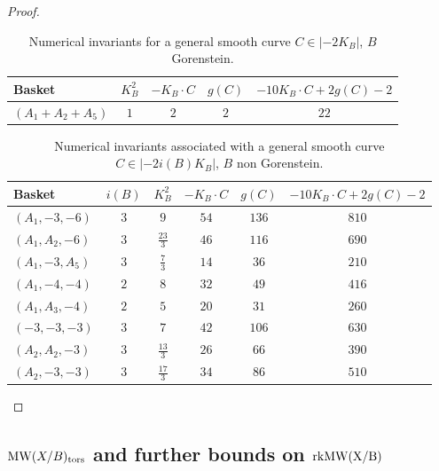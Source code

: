 \documentclass[11pt]{amsart}
\theoremstyle{definition}
\theoremstyle{definition}
\theoremstyle{remark}
\theoremstyle{remark}
\theoremstyle{definition}
\theoremstyle{conjecture}
\newcommand{\MW}{\mathrm{MW}}
\begin{document}
\begin{proof}
\begin{table}[ht]
\caption{\scriptsize  Numerical invariants for a general smooth curve $C\in |-2K_B|$, $B$ Gorenstein.}
\label{tab:gorenstein-delpezzo-2K}
\centering
\small
\renewcommand{\arraystretch}{1.5}
\begin{tabular}{|l|c|c|c|c|}
\hline
\textbf{Basket} & \textbf{$K_B^2$} & \textbf{$-K_B\cdot C$} & \textbf{$g(C)$} & \textbf{$-10K_B\cdot C+2g(C)-2$} \\
\hline
$(A_1+A_2+A_5)$ & $1$ & $2$ & $2$ & $22$ \\
\hline
\end{tabular}
\end{table}
\begin{table}[ht]
\caption{ \scriptsize Numerical invariants associated with a general smooth curve $C\in |-2i(B)K_B|$, $B$ non Gorenstein.}
\label{tab:delpezzo}
\centering
\small
\renewcommand{\arraystretch}{1.5}
\begin{tabular}{|l|c|c|c|c|c|}
\hline
\textbf{Basket} & $i(B)$ & $K_B^2$ &  $-K_B \cdot C %
$ & $g(C)$ & $-10K_B\cdot C+2g(C)-2$ \\
\hline $(A_1,-3,-6)$ & $3$ & $9$ & $54$ & $136$ & $810$ \\
\hline
$(A_1,A_2,-6)$ & $3$ & $\frac{23}{3}$ & $46$ & $116$ & $690$ \\
\hline
$(A_1,-3,A_5)$ & $3$ & $\frac{7}{3}$ & $14$ & $36$ & $210$ \\
\hline
$(A_1,-4,-4)$ & $2$ & $8$ & $32$ & $49$ & $416$ \\
\hline
$(A_1,A_3,-4)$ & $2$ & $5$ & $20$ & $31$ & $260$ \\
\hline
$(-3,-3,-3)$ & $3$ & $7$ & $42$ & $106$ & $630$ \\
\hline
$(A_2,A_2,-3)$ & $3$ & $\frac{13}{3}$ & $26$ & $66$ & $390$ \\
\hline
$(A_2,-3,-3)$ & $3$ & $\frac{17}{3}$ & $34$ & $86$ & $510$ \\
\hline
\end{tabular}

\end{table}
\end{proof}

\medskip
\medskip





\newpage

\subsection{$\MW(X/B)_{\rm tors}$ and further bounds on $\rm rk \MW(X/B)$}\label{subsec:tors}~
\end{document}
